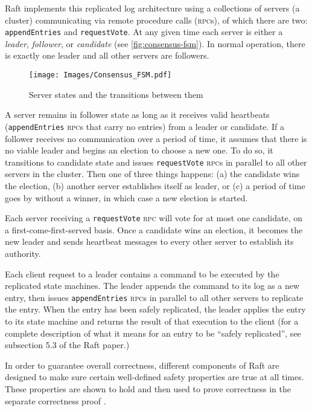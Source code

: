 \documentclass[11pt,chapterprefix=true,toc=bibliography,numbers=noendperiod,
               footnotes=multiple,twoside]{scrreprt}
\newcommand{\requestVoteRPC}[0]{\texttt{requestVote} \textsc{rpc}}
\newcommand{\appendEntriesRPC}[0]{\texttt{appendEntries} \textsc{rpc}}
\begin{document}
Raft implements this replicated log architecture using a collections of servers (a cluster) communicating via remote procedure calls (\textsc{rpc}s), of which there are two: \texttt{appendEntries} and \texttt{requestVote}. At any given time each server is either a \emph{leader}, \emph{follower}, or \emph{candidate} (see \autoref{fig:consensus-fsm}). In normal operation, there is exactly one leader and all other servers are followers.

\begin{figure}[h]
    \centering
    \texttt{[image: Images/Consensus\_FSM.pdf]}
    \caption{Server states and the transitions between them}
    \label{fig:consensus-fsm}
\end{figure}


A server remains in follower state as long as it receives valid heartbeats (\appendEntriesRPC s that carry no entries) from a leader or candidate. If a follower receives no communication over a period of time, it assumes that there is no viable leader and begins an election to choose a new one. To do so, it transitions to candidate state and issues \requestVoteRPC s in parallel to all other servers in the cluster. Then one of three things happens: (a) the candidate wins the election, (b) another server establishes itself as leader, or (c) a period of time goes by without a winner, in which case a new election is started.

Each server receiving a \requestVoteRPC{} will vote for at most one candidate, on a first-come-first-served basis. Once a candidate wins an election, it becomes the new leader and sends heartbeat messages to every other server to establish its authority.


Each client request to a leader contains a command to be executed by the replicated state machines. The leader appends the command to its log as a new entry, then issues \appendEntriesRPC s in parallel to all other servers to replicate the entry. When the entry has been safely replicated, the leader applies the entry to its state machine and returns the result of that execution to the client (for a complete description of what it means for an entry to be \enquote{safely replicated}, see subsection 5.3 of the Raft paper.)


In order to guarantee overall correctness, different components of Raft are designed to make sure certain well-defined safety properties are true at all times. These properties are shown to hold and then used to prove correctness in the separate correctness proof \autocite{raftproof}.
\end{document}
